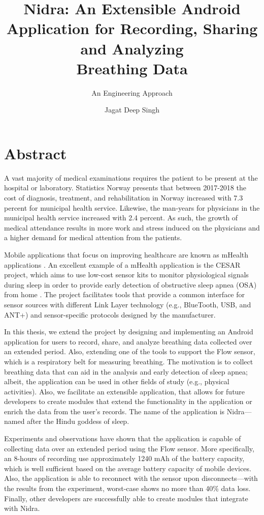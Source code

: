\documentclass[UKenglish]{ifimaster}  %
\title{Nidra: An Extensible Android Application for Recording, Sharing and Analyzing \\ Breathing Data}
\subtitle{An Engineering Approach}
\author{Jagat Deep Singh}
\begin{document}
\duoforside[dept={Department of Informatics},   %
  program={Programming and Networks},  %
  long]                                        %

\frontmatter{}
\chapter*{Abstract}
 A vast majority of medical examinations requires the patient to be present at the hospital or laboratory. Statistics Norway \cite{ssb} presents that between 2017-2018 the cost of diagnosis, treatment, and rehabilitation in Norway increased with 7.3 percent for municipal health service. Likewise, the man-years for physicians in the municipal health service increased with 2.4 percent. As such, the growth of medical attendance results in more work and stress induced on the physicians and a higher demand for medical attention from the patients.
 
 Mobile applications that focus on improving healthcare are known as mHealth applications \cite{kumar2013mobile}. An excellent example of a mHealth application is the CESAR project, which aims to use low-cost sensor kits to monitor physiological signals during sleep in order to provide early detection of obstructive sleep apnea (OSA) from home \cite{cesar}. The project facilitates tools that provide a common interface for sensor sources with different Link Layer technology (e.g., BlueTooth, USB, and ANT+) and sensor-specific protocols designed by the manufacturer.
 
 In this thesis, we extend the project by designing and implementing an Android application for users to record, share, and analyze breathing data collected over an extended period. Also, extending one of the tools to support the Flow sensor, which is a respiratory belt for measuring breathing. The motivation is to collect breathing data that can aid in the analysis and early detection of sleep apnea; albeit, the application can be used in other fields of study (e.g., physical activities). Also, we facilitate an extensible application, that allows for future developers to create modules that extend the functionality in the application or enrich the data from the user's records. The name of the application is Nidra---named after the Hindu goddess of sleep. 
 
 Experiments and observations have shown that the application is capable of collecting data over an extended period using the Flow sensor. More specifically, an 8-hours of recording use approximately 1240 mAh of the battery capacity, which is well sufficient based on the average battery capacity of mobile devices. Also, the application is able to reconnect with the sensor upon disconnects---with the results from the experiment, worst-case shows no more than 40\% data loss. Finally, other developers are successfully able to create modules that integrate with Nidra.
\end{document}
